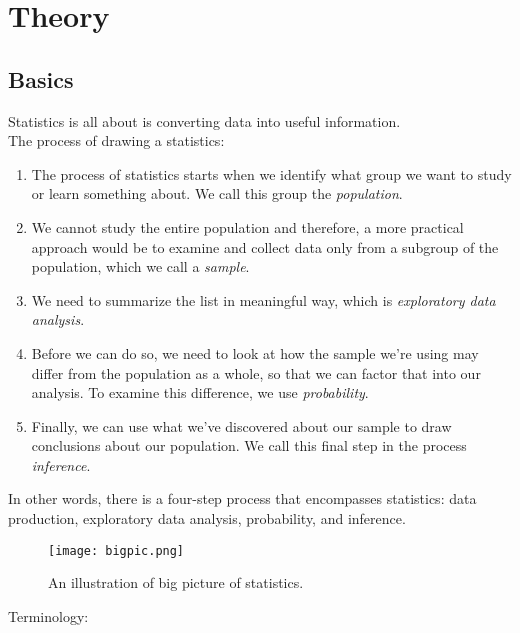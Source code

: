 \documentclass[10pt, a4paper]{article}
\begin{document}
\graphicspath{{/home/cao/Dropbox/thesis/Documents/Notes/statistics/figures/}}
\maketitle
\pagestyle{plain}
\tableofcontents
\section{Theory}
\subsection{Basics}
Statistics is all about is converting data into useful information.\\
The process of drawing a statistics:
\begin{enumerate}
\item The process of statistics starts when we identify what group we want to study or learn something about. We call this group the \emph{population}. 
\item We cannot study the entire population and therefore, a more practical approach would be to examine and collect data only from a subgroup of the population, which we call a \emph{sample}. 
\item We need to summarize the list in meaningful way, which is \emph{exploratory data analysis}.
\item Before we can do so, we need to look at how the sample we're using may differ from the population as a whole, so that we can factor that into our analysis. To examine this difference, we use \emph{probability}. 
\item Finally, we can use what we've discovered about our sample to draw conclusions about our population. We call this final step in the process \emph{inference}.
\end{enumerate}
In other words, there is a four-step process that encompasses statistics: data production, exploratory data analysis, probability, and inference.\\
\begin{figure}
    [h!]
    \centering
    \texttt{[image: bigpic.png]}
    \caption{An illustration of big picture of statistics.}
\end{figure}
Terminology:
\end{document}
